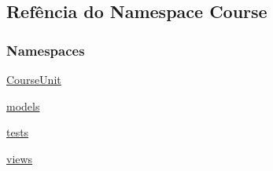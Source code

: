 \hypertarget{namespaceCourse}{\subsection{Refência do Namespace Course}
\label{namespaceCourse}
}
\subsubsection*{Namespaces}
\begin{DoxyCompactItemize}
\item 
\hyperlink{namespaceCourse_1_1CourseUnit}{Course\-Unit}
\item 
\hyperlink{namespaceCourse_1_1models}{models}
\item 
\hyperlink{namespaceCourse_1_1tests}{tests}
\item 
\hyperlink{namespaceCourse_1_1views}{views}
\end{DoxyCompactItemize}
